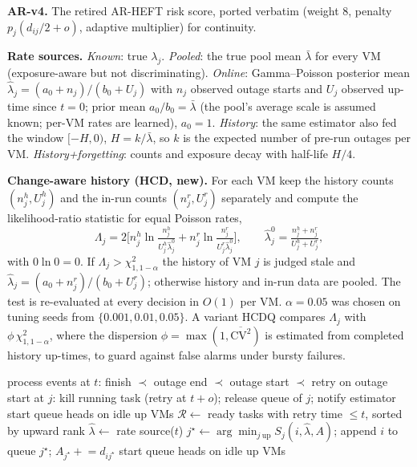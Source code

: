 \documentclass[conference]{IEEEtran}
\begin{document}
\textbf{AR-v4.} The retired AR-HEFT risk score, ported verbatim (weight 8, penalty $p_j(d_{ij}/2+o)$, adaptive
multiplier) for continuity.

\textbf{Rate sources.} \emph{Known}: true $\lambda_j$. \emph{Pooled}: the true pool mean $\bar\lambda$ for every VM
(exposure-aware but not discriminating). \emph{Online}: Gamma--Poisson posterior mean
$\hat\lambda_j = (a_0+n_j)/(b_0+U_j)$ with $n_j$ observed outage starts and $U_j$ observed up-time since $t=0$;
prior mean $a_0/b_0 = \bar\lambda$ (the pool's average scale is assumed known; per-VM rates are learned),
$a_0 = 1$. \emph{History}: the same estimator also fed the window $[-H,0)$, $H = k/\bar\lambda$, so $k$ is the
expected number of pre-run outages per VM. \emph{History+forgetting}: counts and exposure decay with half-life $H/4$.

\textbf{Change-aware history (\textsf{HCD}, new).} For each VM keep the history counts $(n^h_j,U^h_j)$ and the
in-run counts $(n^r_j,U^r_j)$ separately and compute the likelihood-ratio statistic for equal Poisson rates,
\begin{equation}
\Lambda_j = 2\Big[n^h_j\ln\tfrac{n^h_j}{U^h_j\hat\lambda^0_j} + n^r_j\ln\tfrac{n^r_j}{U^r_j\hat\lambda^0_j}\Big],\qquad
\hat\lambda^0_j=\tfrac{n^h_j+n^r_j}{U^h_j+U^r_j},
\end{equation}
with $0\ln 0=0$. If $\Lambda_j>\chi^2_{1,1-\alpha}$ the history of VM $j$ is judged stale and
$\hat\lambda_j=(a_0+n^r_j)/(b_0+U^r_j)$; otherwise history and in-run data are pooled. The test is
re-evaluated at every decision in $O(1)$ per VM. $\alpha=0.05$ was chosen on tuning seeds from
$\{0.001,0.01,0.05\}$. A variant \textsf{HCDQ} compares $\Lambda_j$ with $\phi\,\chi^2_{1,1-\alpha}$, where the
dispersion $\phi=\max(1,\overline{\mathrm{CV}^2})$ is estimated from completed history up-times, to guard against
false alarms under bursty failures.

\begin{algorithm}[t]\small
\caption{Shared online dispatch loop (one invocation per event time)}\label{alg:dispatch}
\begin{algorithmic}[1]
\State process events at $t$: finish $\prec$ outage end $\prec$ outage start $\prec$ retry
\State on outage start at $j$: kill running task (retry at $t+o$); release queue of $j$; notify estimator
\State start queue heads on idle up VMs
\State $\mathcal{R} \gets$ ready tasks with retry time $\le t$, sorted by upward rank
  \State $\hat\lambda \gets$ rate source($t$) 
  \State $j^\star \gets \arg\min_{j\ \text{up}} S_j(i,\hat\lambda, A)$; append $i$ to queue $j^\star$; $A_{j^\star} \mathrel{+}= d_{ij^\star}$
\EndFor
\State start queue heads on idle up VMs
\end{algorithmic}\end{algorithm}
\end{document}
